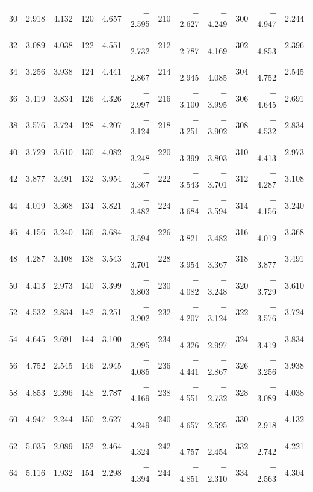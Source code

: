 \begin{table}[!h]
{\begin{tabular}{rrr|rrr|rrr|rrr}
 30 &   2.918 &  4.132 & 120 &   4.657 & $-$2.595 & 210 &  $-$2.627 & $-$4.249 & 300 &  $-$4.947 &  2.244\\
 32 &   3.089 &  4.038 & 122 &   4.551 & $-$2.732 & 212 &  $-$2.787 & $-$4.169 & 302 &  $-$4.853 &  2.396\\
 34 &   3.256 &  3.938 & 124 &   4.441 & $-$2.867 & 214 &  $-$2.945 & $-$4.085 & 304 &  $-$4.752 &  2.545\\
 36 &   3.419 &  3.834 & 126 &   4.326 & $-$2.997 & 216 &  $-$3.100 & $-$3.995 & 306 &  $-$4.645 &  2.691\\
 38 &   3.576 &  3.724 & 128 &   4.207 & $-$3.124 & 218 &  $-$3.251 & $-$3.902 & 308 &  $-$4.532 &  2.834\\
 40 &   3.729 &  3.610 & 130 &   4.082 & $-$3.248 & 220 &  $-$3.399 & $-$3.803 & 310 &  $-$4.413 &  2.973\\
 42 &   3.877 &  3.491 & 132 &   3.954 & $-$3.367 & 222 &  $-$3.543 & $-$3.701 & 312 &  $-$4.287 &  3.108\\
 44 &   4.019 &  3.368 & 134 &   3.821 & $-$3.482 & 224 &  $-$3.684 & $-$3.594 & 314 &  $-$4.156 &  3.240\\
 46 &   4.156 &  3.240 & 136 &   3.684 & $-$3.594 & 226 &  $-$3.821 & $-$3.482 & 316 &  $-$4.019 &  3.368\\
 48 &   4.287 &  3.108 & 138 &   3.543 & $-$3.701 & 228 &  $-$3.954 & $-$3.367 & 318 &  $-$3.877 &  3.491\\
 50 &   4.413 &  2.973 & 140 &   3.399 & $-$3.803 & 230 &  $-$4.082 & $-$3.248 & 320 &  $-$3.729 &  3.610\\
 52 &   4.532 &  2.834 & 142 &   3.251 & $-$3.902 & 232 &  $-$4.207 & $-$3.124 & 322 &  $-$3.576 &  3.724\\
 54 &   4.645 &  2.691 & 144 &   3.100 & $-$3.995 & 234 &  $-$4.326 & $-$2.997 & 324 &  $-$3.419 &  3.834\\
 56 &   4.752 &  2.545 & 146 &   2.945 & $-$4.085 & 236 &  $-$4.441 & $-$2.867 & 326 &  $-$3.256 &  3.938\\
 58 &   4.853 &  2.396 & 148 &   2.787 & $-$4.169 & 238 &  $-$4.551 & $-$2.732 & 328 &  $-$3.089 &  4.038\\
 60 &   4.947 &  2.244 & 150 &   2.627 & $-$4.249 & 240 &  $-$4.657 & $-$2.595 & 330 &  $-$2.918 &  4.132\\
 62 &   5.035 &  2.089 & 152 &   2.464 & $-$4.324 & 242 &  $-$4.757 & $-$2.454 & 332 &  $-$2.742 &  4.221\\
 64 &   5.116 &  1.932 & 154 &   2.298 & $-$4.394 & 244 &  $-$4.851 & $-$2.310 & 334 &  $-$2.563 &  4.304\\

\end{tabular}}
\end{table}
